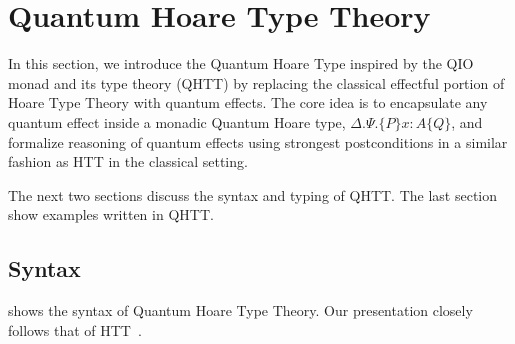 \documentclass[acmsmall,nonacm,timestamp,review=false,anonymous=false]{acmart}
\begin{document}
\section{Quantum Hoare Type Theory}
\label{sec:qhtt}
In this section, we introduce the Quantum Hoare Type inspired by the QIO monad and its type theory (QHTT) by replacing the classical effectful portion of Hoare Type Theory with quantum effects. The core idea is to encapsulate any quantum effect inside a monadic Quantum Hoare type, $\Delta. \Psi .\{P\} x{ : }A \{Q\}$, and formalize reasoning of quantum effects using strongest postconditions in a similar fashion as HTT in the classical setting.

The next two sections discuss the syntax and typing of QHTT. The last section show examples written in QHTT.

\subsection{Syntax}
\label{sec:syntax}

 shows the syntax of Quantum Hoare Type Theory. Our presentation closely follows that of HTT~\cite{nanevski_hoare_2008}.

\end{document}
